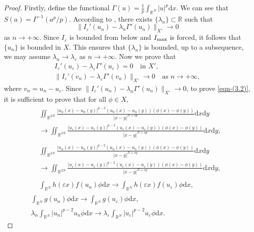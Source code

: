 \documentclass[reqno]{amsart}
\begin{document}
\begin{proof}
Firstly, define the functional 
$\Gamma(u)=\frac{1}{p}\int_{\mathbb{R}^N}|u|^{p}\mathrm{d}x$. 
We can see that $S(a)=\Gamma^{-1}({a^{p}/p})$. 
According to \cite[Proposition 5.12]{ref31}, there exists 
$\{\lambda_n\}\subset\mathbb{R}$ such that
$$
\|I_\varepsilon'(u_n)-\lambda_n\Gamma'(u_n)\|_{X'}\to 0
$$ 
as $n\to+\infty$.
Since $I_\varepsilon$ is bounded from below and $I_{\rm max}$ is forced, it follows that
$\{u_n\}$ is bounded in $X$. 
This ensures that
$\{\lambda_n\}$ is bounded, up to a subsequence, we may assume
$\lambda_n\to \lambda_\varepsilon$ as $n\to+\infty$.
Now we prove that
\begin{gather}\label{eqn-(3.2)}
I_\varepsilon'(u_\varepsilon)-\lambda_\varepsilon\Gamma'(u_\varepsilon)=0\quad 
\text{in } X',\\
\label{eqn-(3.3)}
\|I_\varepsilon'(v_n)-\lambda_\varepsilon\Gamma'(v_n)\|_{X'}\to 0\quad 
\text{as } n\to+\infty,
\end{gather}
where $v_n=u_n-u_\varepsilon$.
Since $\|I_\varepsilon'(u_n)-\lambda_n\Gamma'(u_n)\|_{X'}\to 0$,
to prove \eqref{eqn-(3.2)}, it is sufficient to prove that for all $\phi\in X$,
\begin{gather}\label{eqn-(3.5)}
\begin{aligned}
&\iint_{\mathbb{R}^{2N}}\frac{|u_n(x)-u_n(y)|^{p-2}(u_n(x)-u_n(y))(\phi(x)
 -\phi(y))}{|x-y|^{N+sp}}\mathrm{d}x\mathrm{d}y\\
&\to\iint_{\mathbb{R}^{2N}}\frac{|u_\varepsilon(x)
 -u_\varepsilon(y)|^{p-2}(u_\varepsilon(x)-u_\varepsilon(y))(\phi(x)
 -\phi(y))}{|x-y|^{N+sp}}\mathrm{d}x\mathrm{d}y,
\end{aligned} \\
\label{eqn-(3.6)}
\begin{aligned}
&\iint_{\mathbb{R}^{2N}}\frac{|u_n(x)-u_n(y)|^{q-2}(u_n(x)-u_n(y))(\phi(x)-\phi(y))}{|x-y|^{N+sq}}\mathrm{d}x\mathrm{d}y\\
&\to\iint_{\mathbb{R}^{2N}}\frac{|u_\varepsilon(x)-u_\varepsilon(y)|^{q-2}(u_\varepsilon(x)-u_\varepsilon(y))(\phi(x)-\phi(y))}{|x-y|^{N+sq}}\mathrm{d}x\mathrm{d}y,
\end{aligned} \\
\label{eqn-(3.7)}
\begin{aligned}
&\int_{\mathbb{R}^N}h(\varepsilon x)f(u_n)\phi\mathrm{d}x
\to\int_{\mathbb{R}^N}h(\varepsilon x)f(u_\varepsilon)\phi\mathrm{d}x,
\end{aligned} \\
\label{eqn-(3.8)}
\int_{\mathbb{R}^N}g(u_n)\phi\mathrm{d}x\to
 \int_{\mathbb{R}^N}g(u_\varepsilon)\phi\mathrm{d}x,\\
\label{eqn-(3.9)}
\lambda_n \int_{\mathbb{R}^N}|u_n|^{p-2}u_n\phi\mathrm{d}x
\to\lambda_\varepsilon \int_{\mathbb{R}^N}|u_\varepsilon|^{p-2}
u_\varepsilon\phi\mathrm{d}x.
\end{gather}


\end{proof}
\end{document}
